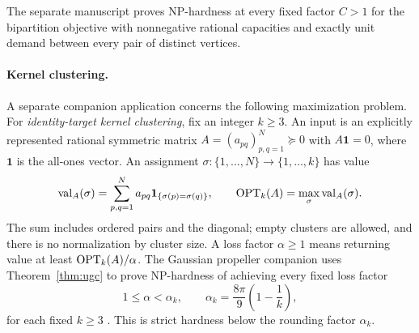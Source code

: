 The separate manuscript
\cite[Theorem~1.1]{OpenAIUniformSparsest2026} proves
NP-hardness at every fixed factor \(C>1\) for the bipartition objective with
nonnegative rational capacities and exactly unit demand between every
pair of distinct vertices.

\paragraph{Kernel clustering.}
A separate companion application concerns the following maximization
problem. For \emph{identity-target kernel clustering}, fix an integer \(k\ge3\).
An input is an explicitly represented rational symmetric matrix
\(A=(a_{pq})_{p,q=1}^N\succeq0\) with \(A\mathbf1=0\), where
\(\mathbf1\) is the all-ones vector.
An assignment \(\sigma:\{1,\ldots,N\}\to\{1,\ldots,k\}\) has value
\[
 \operatorname{val}_A(\sigma)=\sum_{p,q=1}^N
 a_{pq}\mathbf1_{\{\sigma(p)=\sigma(q)\}},
 \qquad
 \operatorname{OPT}_k(A)=\max_\sigma\operatorname{val}_A(\sigma).
\]
The sum includes ordered pairs and the diagonal; empty clusters are
allowed, and there is no normalization by cluster size. A loss factor
\(\alpha\ge1\) means returning value at least \(\operatorname{OPT}_k(A)/\alpha\).
The Gaussian propeller companion uses Theorem~\ref{thm:ugc} to prove
NP-hardness of achieving every fixed loss factor
\[
 1\le\alpha<\alpha_k,
 \qquad \alpha_k=\frac{8\pi}{9}\left(1-\frac1k\right),
\]
for each fixed \(k\ge3\)
\cite[Theorem~6.1]{OpenAIGaussianPropeller2026}.
This is strict hardness below the rounding factor
\(\alpha_k\).
